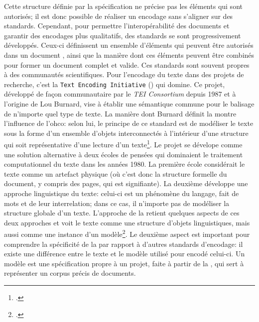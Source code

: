 Cette structure définie par la spécification \xml{} ne précise pas les éléments qui sont autorisés; il est donc possible de réaliser un encodage sans s'aligner sur des standards. Cependant, pour permettre l'interopérabilité des documents et garantir des encodages plus qualitatifs, des standards se sont progressivement développés. Ceux-ci définissent un ensemble d'éléments qui peuvent être autorisés dans un document \xml{}, ainsi que la manière dont ces éléments peuvent être combinés pour former un document complet et valide. Ces standards sont souvent propres à des communautés scientifiques. Pour l'encodage du texte dans des projets de recherche, c'est la \texttt{Text Encoding Initiative} (\tei{}) qui domine. Ce projet, développé de façon communautaire par le \textit{TEI Consortium} depuis 1987 et à l'origine de Lou Burnard, vise à établir une sémantique commune pour le balisage de n'importe quel type de texte. La manière dont Burnard définit la \tei{} montre l'influence de l'\gls{ohco}: selon lui, le principe de ce standard est de modéliser le texte sous la forme d'un ensemble d'objets interconnectés à l'intérieur d'une structure qui soit représentative d'une lecture d'un texte\footcite[p. 108]{burnard_how_2019}. Le projet se dévelope comme une solution alternative à deux écoles de pensées qui dominaient le traitement computationnel du texte dans les années 1980. La première école considérait le texte comme un artefact physique (où c'est donc la structure formelle du document, y compris des pages, qui est signifiante). La deuxième développe une approche linguistique du texte: celui-ci est un phénomène du langage, fait de mots et de leur interrelation; dans ce cas, il n'importe pas de modéliser la structure globale d'un texte. L'approche de la \tei{} retient quelques aspects de ces deux approches et voit le texte comme une structure d'objets linguistiques, mais aussi comme une instance d'un modèle\footcite[§3]{burnard_search_2021}. Le deuxième aspect est important pour comprendre la spécificité de la \tei{} par rapport à d'autres standards d'encodage: il existe une différence entre le texte et le modèle utilisé pour encodé celui-ci. Un modèle est une spécification propre à un projet, faite à partir de la \tei{}, qui sert à représenter un corpus précis de documents. 


